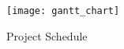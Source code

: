 \begin{figure}[h!]
\centering
\texttt{[image: gantt\_chart]}
\caption{Project Schedule}
\label{fig:schedule}
\end{figure}

